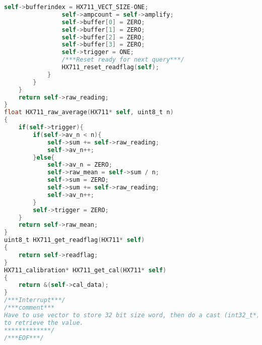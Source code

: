 \begin{lstlisting}[language=C, caption={hx711.c}, label=hx711-c, captionpos=b]
				self->bufferindex = HX711_VECT_SIZE-ONE;
				self->ampcount = self->amplify;
				self->buffer[0] = ZERO;
				self->buffer[1] = ZERO;
				self->buffer[2] = ZERO;
				self->buffer[3] = ZERO;
				self->trigger = ONE;
				/***Reset ready for next query***/
				HX711_reset_readflag(self);
			}
		}
	}
	return self->raw_reading;
}
float HX711_raw_average(HX711* self, uint8_t n)
{
	if(self->trigger){
		if(self->av_n < n){
			self->sum += self->raw_reading;
			self->av_n++;
		}else{
			self->av_n = ZERO;
			self->raw_mean = self->sum / n;
			self->sum = ZERO;
			self->sum += self->raw_reading;
			self->av_n++;
		}
		self->trigger = ZERO;
	}
	return self->raw_mean;
}
uint8_t HX711_get_readflag(HX711* self)
{
	return self->readflag;
}
HX711_calibration* HX711_get_cal(HX711* self)
{
	return &(self->cal_data);
}
/***Interrupt***/
/***comment***
Have to use vector to store 32 bit size word, then do a cast (int32_t*)
to retrieve the value.
*************/
/***EOF***/
\end{lstlisting}
